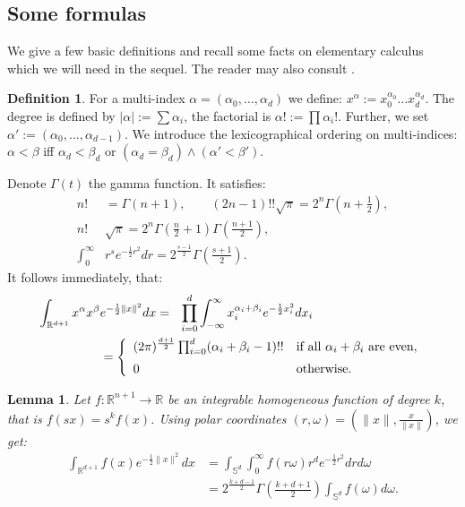 \documentclass{amsart}
\newcommand{\coloneqq}{:=}
\newcommand{\R}{\mathbb{R}}
\renewcommand{\S}{\mathbb{S}}
\theoremstyle{plain}
\newtheorem{lemma}[theorem]{Lemma}
\theoremstyle{definition}
\newtheorem{definition}[theorem]{Definition}
\theoremstyle{remark}
\begin{document}
\subsection{Some formulas}
We give a few basic definitions and recall some facts on elementary calculus which we will need in the sequel. The reader may also consult \cite{Folland}.
\begin{definition}
For a multi-index $\alpha=(\alpha_0,\ldots,\alpha_d)$ we define: $x^\alpha \coloneqq x_0^{\alpha_0}\ldots x_d^{\alpha_d}$. The degree is defined by $|\alpha |\coloneqq\sum\alpha_i$, the factorial is $\alpha! \coloneqq \prod \alpha_i!$. Further, we set
$\alpha'\coloneqq(\alpha_0,\ldots,\alpha_{d-1})$. We introduce the lexicographical ordering on multi-indices: $\alpha < \beta$ iff $\alpha_d < \beta_d$ or $(\alpha_d=\beta_d) \wedge (\alpha'<\beta')$.
\end{definition}
Denote $\Gamma(t)$ the gamma function. It satisfies:
\begin{align}
n!&=\Gamma(n+1),\qquad (2n-1)!!\sqrt{\pi} =2^{n}\Gamma\left(n+\tfrac{1}{2}\right), \\
\label{doublegamma}
n!&\sqrt{\pi}=2^{n}\Gamma\left(\tfrac{n}{2}+1\right)\Gamma\left(\tfrac{n+1}{2}\right) ,\\
\int_0^\infty& r^se^{-\frac{1}{2}r^2} dr = 2^{\frac{s-1}{2}}\Gamma\left(\tfrac{s+1}{2}\right).
\end{align}
It follows immediately, that:
\begin{align}    \label{monoint}
 \int_{\R^{d+1}}x^\alpha x^\beta & e^{-\frac{1}{2}\|x\|^2} dx = \ \ 
\displaystyle \prod_{i=0}^d \int_{-\infty}^\infty x_i^{\alpha_i+\beta_i} e^{-\frac{1}{2}x_i^2} dx_i \\
 &= \left\{
\begin{array}{*2{l}p{5cm}}
(2 \pi)^{\frac{d+1}{2}}\prod_{i=0}^d (\alpha_i+\beta_i-1)!! &\text{if all }\alpha_i+\beta_i\text{ are even}, \vspace{0.2cm} \\ 
 0 &\text{otherwise}.
\end{array}
  \right.\nonumber
\end{align}

\begin{lemma}\label{homosphere}
Let $f:\R^{n+1}\rightarrow\R$ be an integrable homogeneous function of degree $k$, that is $f(sx) = s^kf(x)$. Using polar coordinates $(r,\omega) = (\|x\|,\frac{x}{\|x\|})$, we get:
\begin{align*}
\int_{\R^{d+1}}f(x)e^{-\frac{1}{2}\|x\|^2} dx &= \int_{\S^d}\!\int_0^\infty\! f(r\omega) r^d e^{-\frac{1}{2}r^2}dr d\omega \\
&= 2^{\frac{k+d-1}{2}}\Gamma\left(\tfrac{k+d+1}{2}\right)\int_{\S^d}f(\omega)d\omega .
\end{align*}
\end{lemma}
\end{document}
